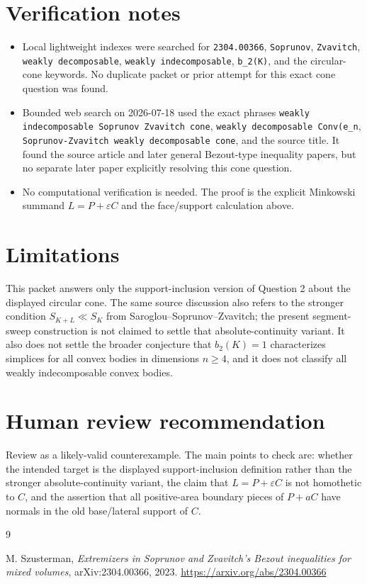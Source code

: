 \documentclass[11pt]{amsart}
\theoremstyle{remark}
\newcommand{\eps}{\varepsilon}
\begin{document}
\section*{Verification notes}

\begin{itemize}[leftmargin=*]
\item Local lightweight indexes were searched for \texttt{2304.00366},
\texttt{Soprunov}, \texttt{Zvavitch}, \texttt{weakly decomposable},
\texttt{weakly indecomposable}, \texttt{b\_2(K)}, and the circular-cone
keywords. No duplicate packet or prior attempt for this exact cone question
was found.
\item Bounded web search on 2026-07-18 used the exact phrases
\texttt{weakly indecomposable Soprunov Zvavitch cone},
\texttt{weakly decomposable Conv(e\_n}, \texttt{Soprunov-Zvavitch weakly
decomposable cone}, and the source title. It found the source article and
later general Bezout-type inequality papers, but no separate later paper
explicitly resolving this cone question.
\item No computational verification is needed. The proof is the explicit
Minkowski summand \(L=P+\eps C\) and the face/support calculation above.
\end{itemize}

\section*{Limitations}

This packet answers only the support-inclusion version of Question 2 about the
displayed circular cone. The same source discussion also refers to the stronger
condition \(S_{K+L}\ll S_K\) from Saroglou--Soprunov--Zvavitch; the present
segment-sweep construction is not claimed to settle that absolute-continuity
variant. It also does not settle the broader conjecture that \(b_2(K)=1\)
characterizes simplices for all convex bodies in dimensions \(n\geq 4\), and
it does not classify all weakly indecomposable convex bodies.

\section*{Human review recommendation}

Review as a likely-valid counterexample. The main points to check are:
whether the intended target is the displayed support-inclusion definition
rather than the stronger absolute-continuity variant, the claim that
\(L=P+\eps C\) is not homothetic to \(C\), and the assertion that all
positive-area boundary pieces of \(P+aC\) have normals in the old base/lateral
support of \(C\).

\begin{thebibliography}{9}

M. Szusterman,
\emph{Extremizers in Soprunov and Zvavitch's Bezout inequalities for mixed volumes},
arXiv:2304.00366, 2023.
\url{https://arxiv.org/abs/2304.00366}

\end{thebibliography}
\end{document}
